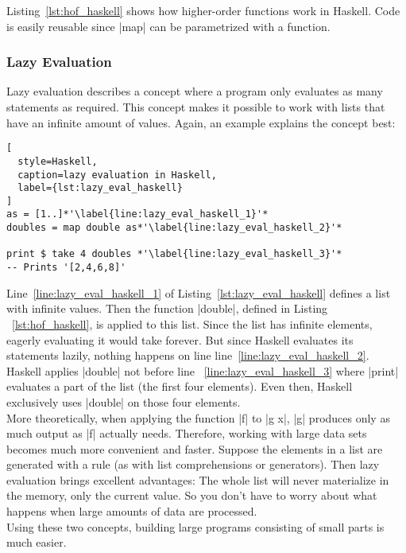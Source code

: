 Listing~\ref{lst:hof_haskell} shows how higher-order functions work in Haskell.
Code is easily reusable since |map| can be parametrized with a function.

\subsubsection{Lazy Evaluation} %
\label{subsub:Evaluation}
Lazy evaluation describes a concept where a program only evaluates as many
statements as required. This concept makes it possible to work with lists that
have an infinite amount of values. Again, an example explains the concept best:

\begin{lstlisting}[
  style=Haskell,
  caption=lazy evaluation in Haskell,
  label={lst:lazy_eval_haskell}
]
as = [1..]*'\label{line:lazy_eval_haskell_1}'*
doubles = map double as*'\label{line:lazy_eval_haskell_2}'*

print $ take 4 doubles *'\label{line:lazy_eval_haskell_3}'*
-- Prints '[2,4,6,8]'
\end{lstlisting}
Line~\ref{line:lazy_eval_haskell_1} of Listing~\ref{lst:lazy_eval_haskell}
defines a list with infinite values. Then the function |double|, defined in
Listing ~\ref{lst:hof_haskell}, is applied to this list. Since the list has
infinite elements, eagerly evaluating it would take forever. But since Haskell
evaluates its statements lazily, nothing happens on line
line~\ref{line:lazy_eval_haskell_2}. Haskell applies |double| not before line
~\ref{line:lazy_eval_haskell_3} where |print| evaluates a part of the list (the
first four elements). Even then, Haskell exclusively uses |double| on those
four elements.\\
More theoretically, when applying the function |f| to |g x|, |g| produces only
as much output as |f| actually needs. Therefore, working with large data sets
becomes much more convenient and faster. Suppose the elements in a list are
generated with a rule (as with list comprehensions or generators). Then lazy
evaluation brings excellent advantages: The whole list will never materialize
in the memory, only the current value. So you don't have to worry about what
happens when large amounts of data are processed. \\ Using these two concepts,
building large programs consisting of small parts is much easier.


